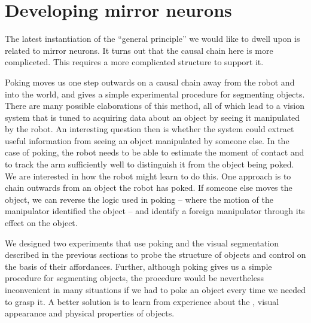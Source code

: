 
\section{Developing mirror neurons}

\ifverbose
The latest instantiation of the ``general principle'' we would like to
dwell upon is related to mirror neurons. It turns out that the causal
chain here is more compliceted. This requires a more complicated
structure to support it.
\fi

Poking moves us one step outwards on a causal chain away from the
robot and into the world, and gives a simple experimental procedure
for segmenting objects.  There are many possible elaborations of this
method, all of which lead to a
vision system that is tuned to acquiring data about an object by
seeing it manipulated by the robot.  An interesting question then is
whether the system could extract useful information from seeing an
object manipulated by someone else.  In the case of poking, the robot
needs to be able to estimate the moment of contact and to track the arm
sufficiently well to distinguish it from the object being poked.  We
are interested in how the robot might learn to do this.  One approach
is to chain outwards from an object the robot has poked.  If someone
else moves the object, we can reverse the logic used in poking --
where the motion of the manipulator identified the object -- and
identify a foreign manipulator through its effect on the object.

We designed two experiments that use poking and the visual
segmentation described in the previous sections to probe 
the structure of objects and control \ahhbehavior{} on the basis of
their affordances. Further, although poking gives us a simple 
procedure for segmenting objects, the procedure would be 
nevertheless inconvenient in many situations if we had to poke an 
object every time we needed to grasp it. A better solution is to
learn from experience about the \ahhbehavior{}, visual appearance and 
physical properties of objects.

